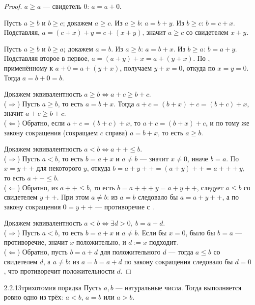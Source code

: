 \begin{proof}
 $a \geq a$ — свидетель $0$: $a = a + 0$.

 Пусть $a \geq b$ и $b \geq c$; докажем $a \geq c$. Из
$a \geq b$: $a = b + y$. Из $b \geq c$: $b = c + x$. Подставляя,
$a = (c+x)+y = c+(x+y)$, значит $a \geq c$ со свидетелем $x+y$.

 Пусть $a \geq b$ и $b \geq a$; докажем $a=b$. Из
$a \geq b$: $a = b+x$. Из $b \geq a$: $b = a+y$. Подставляя второе в первое,
$a = (a+y)+x = a+(y+x)$. По , применённому к
$a+0=a+(y+x)$, получаем $y+x=0$, откуда по 
$x=y=0$. Тогда $a = b+0 = b$.

 Докажем эквивалентность
$a \geq b \iff a+c \geq b+c$.\\
($\Rightarrow$) Пусть $a \geq b$, то есть $a = b+x$. Тогда
$a+c = (b+x)+c = (b+c)+x$, значит $a+c \geq b+c$.\\
($\Leftarrow$) Обратно, если $a+c=(b+c)+x$, то $a+c = (b+x)+c$, и по тому же закону
сокращения (сокращаем $c$ справа) $a=b+x$, то есть $a \geq b$.

 Докажем эквивалентность $a<b \iff a{+}{+} \leq b$.\\
($\Rightarrow$) Пусть $a<b$, то есть $b=a+x$ и $a \neq b$ — значит $x \neq 0$, иначе
$b=a$. По  $x=y{+}{+}$ для некоторого $y$, откуда
$b = a+y{+}{+} = (a+y){+}{+} = a{+}{+}+y$, то есть $a{+}{+} \leq b$.\\
($\Leftarrow$) Обратно, из $a{+}{+} \leq b$, то есть $b = a{+}{+}+y = a+y{+}{+}$,
следует $a \leq b$ со свидетелем $y{+}{+}$. При этом $a \neq b$: из $a=b$ следовало бы
$a=a+y{+}{+}$, а по закону сокращения $0=y{+}{+}$ — противоречие с
.

 Докажем эквивалентность $a<b \iff \exists d>0,\ b=a+d$.\\
($\Rightarrow$) Пусть $a<b$, то есть $b=a+x$ и $a \neq b$. Если бы $x=0$, было бы
$b=a$ — противоречие, значит $x$ положительно, и $d:=x$ подходит.\\
($\Leftarrow$) Обратно, пусть $b=a+d$ для положительного $d$ — тогда $a \leq b$ со
свидетелем $d$, а $a \neq b$: из $a=b=a+d$ по закону сокращения следовало бы $d=0$,
что противоречит положительности $d$.
\end{proof}

\begin{proposition}{2.2.13}{трихотомия порядка}
Пусть $a,b$ — натуральные числа. Тогда выполняется ровно одно из трёх: $a<b$, $a=b$
или $a>b$.
\end{proposition}

